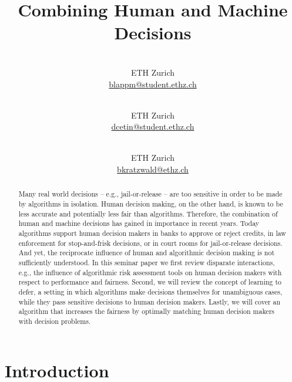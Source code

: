 \documentclass[11pt,a4paper,final]{article}
\begin{document}
\title{Combining Human and Machine Decisions}

\author{
   \\
   ETH Zurich\\
   \url{blappm@student.ethz.ch} \\
   \and
   \\
   ETH Zurich\\
   \url{dcetin@student.ethz.ch} \\
   \and
   \\
   ETH Zurich\\
   \url{bkratzwald@ethz.ch} \\
}

\date{}

\maketitle

\begin{abstract}

Many real world decisions -- e.g., jail-or-release -- are too sensitive in order to be made by algorithms in isolation. Human decision making, on the other hand, is known to be less accurate and potentially less fair than algorithms. Therefore, the combination of human and machine decisions has gained in importance in recent years. Today algorithms support human decision makers in banks to approve or reject credits, in law enforcement for stop-and-frisk decisions, or in court rooms for jail-or-release decisions. And yet, the reciprocate influence of human and algorithmic decision making is not sufficiently understood. In this seminar paper we first review disparate interactions, e.g., the influence of algorithmic risk assessment tools on human decision makers with respect to performance and fairness. Second, we will review the concept of learning to defer, a setting in which algorithms make decisions themselves for unambiguous cases, while they pass sensitive decisions to human decision makers. Lastly, we will cover an algorithm that increases the fairness by optimally matching human decision makers with decision problems. 
\end{abstract}

\section{Introduction}
\end{document}
